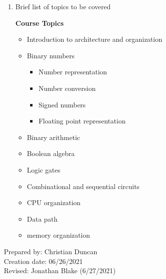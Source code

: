 \begin{enumerate}[1.]
\item Brief list of topics to be covered\\
  {\bfseries
    Course Topics
    \begin{itemize}
      \item Introduction to architecture and organization
      \item Binary numbers
      \begin{itemize}
        \item Number representation
        \item Number conversion
        \item Signed numbers
        \item Floating point representation
      \end{itemize}
      \item Binary arithmetic
      \item Boolean algebra
      \item Logic gates
      \item Combinational and sequential circuits
      \item CPU organization
      \item Data path
      \item memory organization
    \end{itemize}
  }

\end{enumerate}

\noindent Prepared by: Christian Duncan\\
\noindent Creation date: 06/26/2021\\
\noindent Revised: Jonathan Blake (6/27/2021)\\
